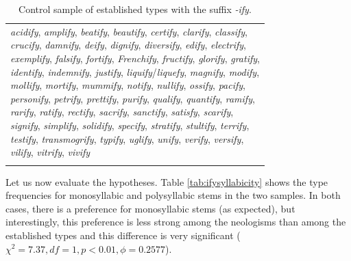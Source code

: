 \begin{table}[!htbp]
\caption{Control sample of established types with the suffix \textit{-ify}.}
\label{tab:ifycontrol}
\begin{tabular}[t]{l}
\lsptoprule
\makecell[tl]{
\textit{acidify}, \textit{amplify}, \textit{beatify}, \textit{beautify}, \textit{certify}, \textit{clarify}, \textit{classify}, \\ \textit{crucify}, \textit{damnify}, \textit{deify}, \textit{dignify}, \textit{diversify}, \textit{edify}, \textit{electrify}, \\ \textit{exemplify}, \textit{falsify}, \textit{fortify}, \textit{Frenchify}, \textit{fructify}, \textit{glorify}, \textit{gratify}, \\ \textit{identify}, \textit{indemnify}, \textit{justify}, \textit{liquify}/\textit{liquefy}, \textit{magnify}, \textit{modify}, \\ \textit{mollify}, \textit{mortify}, \textit{mummify}, \textit{notify}, \textit{nullify}, \textit{ossify}, \textit{pacify}, \\ \textit{personify}, \textit{petrify}, \textit{prettify}, \textit{purify}, \textit{qualify}, \textit{quantify}, \textit{ramify}, \\ \textit{rarify}, \textit{ratify}, \textit{rectify}, \textit{sacrify}, \textit{sanctify}, \textit{satisfy}, \textit{scarify}, \\ \textit{signify}, \textit{simplify}, \textit{solidify}, \textit{specify}, \textit{stratify}, \textit{stultify}, \textit{terrify}, \\ \textit{testify}, \textit{transmogrify}, \textit{typify}, \textit{uglify}, \textit{unify}, \textit{verify}, \textit{versify}, \\ \textit{vilify}, \textit{vitrify}, \textit{vivify}} \\ 
\lspbottomrule
\end{tabular}
\end{table}

Let us now evaluate the hypotheses. Table \ref{tab:ifysyllabicity} shows the type frequencies for monosyllabic and polysyllabic stems in the two samples. In both cases, there is a preference for monosyllabic stems (as expected), but interestingly, this preference is less strong among the neologisms than among the established types and this difference is very significant ($\chi^2 = 7.37, df = 1, p < 0.01 , \phi = 0.2577$).

